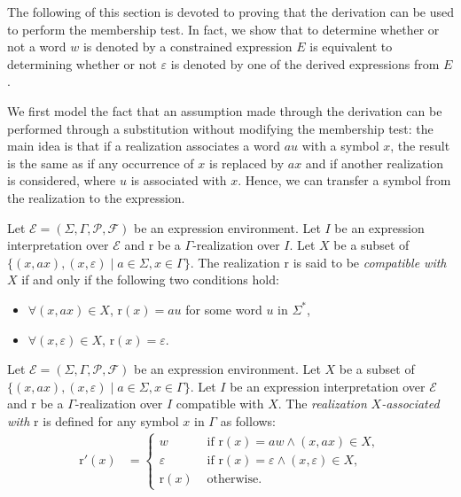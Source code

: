 \documentclass[a4paper]{llncs}
\begin{document}
  The following of this section is devoted to proving that the derivation can be used to perform the membership test. In fact, we show that to determine whether or not a word $w$ is denoted by a constrained expression $E$ is equivalent to determining whether or not $\varepsilon$ is denoted by one of the derived expressions from $E$.
  
  We first model the fact that an assumption made through the derivation can be performed through a substitution without modifying the membership test: the main idea is that if a realization associates a word $au$ with a symbol $x$, the result is the same as if any occurrence of $x$ is replaced by $ax$ and if another realization is considered, where $u$ is associated with $x$. Hence, we can transfer a symbol from the realization to the expression.
  
  \begin{definition}
    Let $\mathcal{E}=(\Sigma,\Gamma,\mathcal{P},\mathcal{F})$ be an expression environment. Let $I$ be an expression interpretation over $\mathcal{E}$ and $\mathrm{r}$ be a $\Gamma$-realization over $I$. Let $X$ be a subset of $\{(x,ax),(x,\varepsilon)\mid a\in\Sigma,x\in\Gamma\}$. The realization $\mathrm{r}$ is said to be \emph{compatible with} $X$ if and only if the following  two conditions hold:
    \begin{itemize}
      \item $\forall (x,ax)\in X$, $\mathrm{r}(x)=au$ for some word $u$ in $\Sigma^*$,
      \item $\forall (x,\varepsilon)\in X$, $\mathrm{r}(x)=\varepsilon$.
    \end{itemize}
  \end{definition}
  
  \begin{definition}
    Let $\mathcal{E}=(\Sigma,\Gamma,\mathcal{P},\mathcal{F})$ be an expression environment. Let $X$ be a subset of $\{(x,ax),(x,\varepsilon)\mid a\in\Sigma,x\in\Gamma\}$. Let $I$ be an expression interpretation over $\mathcal{E}$ and $\mathrm{r}$ be a $\Gamma$-realization over $I$ compatible with $X$.  The \emph{realization} $X$\emph{-associated with} $\mathrm{r}$ is defined for any symbol $x$ in $\Gamma$ as follows:
    \begin{align*} 
      \mathrm{r}'(x)&=
        \begin{cases}
            w & \text{ if } \mathrm{r}(x)=aw \wedge (x,ax)\in X,\\
            \varepsilon & \text{ if } \mathrm{r}(x)=\varepsilon \wedge (x,\varepsilon)\in X,\\
            \mathrm{r}(x) & \text{ otherwise.}
         \end{cases}
     \end{align*}
  \end{definition}
  
\end{document}
